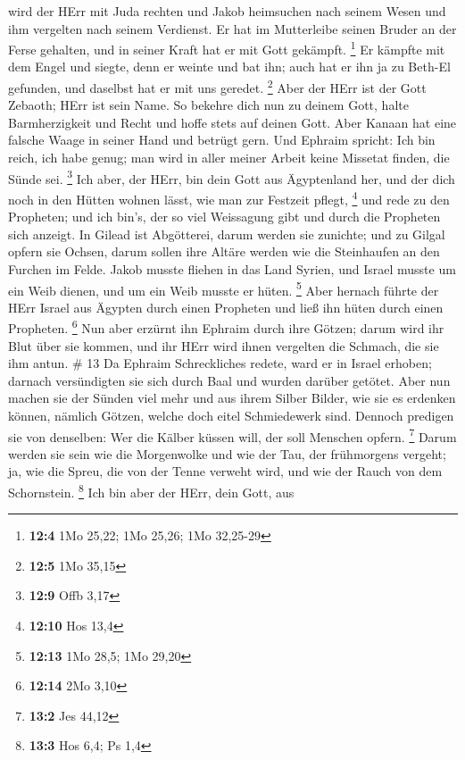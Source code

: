 wird der HErr mit Juda rechten und Jakob heimsuchen nach seinem Wesen
und ihm vergelten nach seinem Verdienst.  Er hat im
Mutterleibe seinen Bruder an der Ferse gehalten, und in seiner Kraft hat
er mit Gott gekämpft. \footnote{\textbf{12:4} 1Mo 25,22; 1Mo 25,26; 1Mo
  32,25-29}  Er kämpfte mit dem Engel und siegte, denn er
weinte und bat ihn; auch hat er ihn ja zu Beth-El gefunden, und daselbst
hat er mit uns geredet. \footnote{\textbf{12:5} 1Mo 35,15} 
Aber der HErr ist der Gott Zebaoth; HErr ist sein Name.  So
bekehre dich nun zu deinem Gott, halte Barmherzigkeit und Recht und
hoffe stets auf deinen Gott.  Aber Kanaan hat eine falsche
Waage in seiner Hand und betrügt gern.  Und Ephraim spricht:
Ich bin reich, ich habe genug; man wird in aller meiner Arbeit keine
Missetat finden, die Sünde sei. \footnote{\textbf{12:9} Offb 3,17}
 Ich aber, der HErr, bin dein Gott aus Ägyptenland her, und
der dich noch in den Hütten wohnen lässt, wie man zur Festzeit pflegt,
\footnote{\textbf{12:10} Hos 13,4}  und rede zu den
Propheten; und ich bin's, der so viel Weissagung gibt und durch die
Propheten sich anzeigt.  In Gilead ist Abgötterei, darum
werden sie zunichte; und zu Gilgal opfern sie Ochsen, darum sollen ihre
Altäre werden wie die Steinhaufen an den Furchen im Felde. 
Jakob musste fliehen in das Land Syrien, und Israel musste um ein Weib
dienen, und um ein Weib musste er hüten. \footnote{\textbf{12:13} 1Mo
  28,5; 1Mo 29,20}  Aber hernach führte der HErr Israel aus
Ägypten durch einen Propheten und ließ ihn hüten durch einen Propheten.
\footnote{\textbf{12:14} 2Mo 3,10}  Nun aber erzürnt ihn
Ephraim durch ihre Götzen; darum wird ihr Blut über sie kommen, und ihr
HErr wird ihnen vergelten die Schmach, die sie ihm antun. \# 13
 Da Ephraim Schreckliches redete, ward er in Israel erhoben;
darnach versündigten sie sich durch Baal und wurden darüber getötet.
 Aber nun machen sie der Sünden viel mehr und aus ihrem
Silber Bilder, wie sie es erdenken können, nämlich Götzen, welche doch
eitel Schmiedewerk sind. Dennoch predigen sie von denselben: Wer die
Kälber küssen will, der soll Menschen opfern. \footnote{\textbf{13:2}
  Jes 44,12}  Darum werden sie sein wie die Morgenwolke und
wie der Tau, der frühmorgens vergeht; ja, wie die Spreu, die von der
Tenne verweht wird, und wie der Rauch von dem Schornstein. \footnote{\textbf{13:3}
  Hos 6,4; Ps 1,4}  Ich bin aber der HErr, dein Gott, aus
